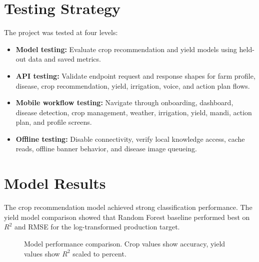 \documentclass[12pt,a4paper]{report}
\begin{document}
\section{Testing Strategy}

The project was tested at four levels:

\begin{itemize}[leftmargin=1.5em]
  \item \textbf{Model testing:} Evaluate crop recommendation and yield models using held-out data and saved metrics.
  \item \textbf{API testing:} Validate endpoint request and response shapes for farm profile, disease, crop recommendation, yield, irrigation, voice, and action plan flows.
  \item \textbf{Mobile workflow testing:} Navigate through onboarding, dashboard, disease detection, crop management, weather, irrigation, yield, mandi, action plan, and profile screens.
  \item \textbf{Offline testing:} Disable connectivity, verify local knowledge access, cache reads, offline banner behavior, and disease image queueing.
\end{itemize}

\section{Model Results}

The crop recommendation model achieved strong classification performance. The yield model comparison showed that Random Forest baseline performed best on $R^2$ and RMSE for the log-transformed production target.

\begin{figure}[H]
\centering
{}
\caption{Model performance comparison. Crop values show accuracy, yield values show $R^2$ scaled to percent.}
\label{fig:performance}
\end{figure}
\end{document}
